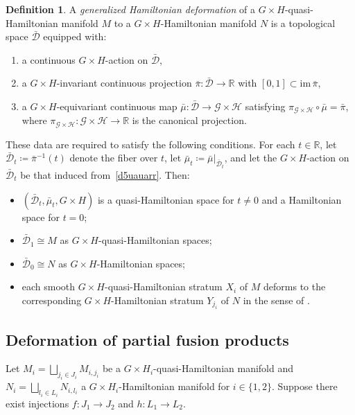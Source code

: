 \documentclass[reqno]{amsart}
\theoremstyle{plain}
\theoremstyle{definition}
\newtheorem{Def}[Thm]{Definition}
\begin{document}
\begin{Def}\label{gen H}
A \emph{generalized Hamiltonian deformation} of a $G\times H$-quasi-Hamiltonian manifold $M$ to a $G\times H$-Hamiltonian manifold $N$ is a topological space $\bar{\mathcal{D}}$ equipped with:
\begin{enumerate}[label={\textup{(\roman*)}}]
\item\label{d5uauarr} a continuous $G\times H$-action on $\bar{\mathcal{D}}$,
\item a $G\times H$-invariant continuous projection $\bar{\pi}: \bar{\mathcal{D}} \to \mathbb{R}$ with $[0,1] \subset \mathrm{im}\,\bar{\pi}$,
\item a $G\times H$-equivariant continuous map $\bar{\mu}: \bar{\mathcal{D}} \to \mathcal{G} \times \mathcal{H}$ satisfying $\pi_{\mathcal{G} \times \mathcal{H}} \circ \bar{\mu} = \bar{\pi}$, where $\pi_{\mathcal{G} \times \mathcal{H}}: \mathcal{G} \times \mathcal{H} \to \mathbb{R}$ is the canonical projection.
\end{enumerate}
These data are required to satisfy the following conditions. For each $t \in \mathbb{R}$, let $\bar{\mathcal{D}}_t \coloneqq \bar{\pi}^{-1}(t)$ denote the fiber over $t$, let $\bar{\mu}_t \coloneqq \bar{\mu}|_{\bar{\mathcal{D}}_t}$, and let the $G\times H$-action on $\bar{\mathcal{D}}_t$ be that induced from~\ref{d5uauarr}. Then:
\begin{itemize}
\item $(\bar{\mathcal{D}}_t, \bar{\mu}_t, G\times H)$ is a quasi-Hamiltonian space for $t \neq 0$ and a Hamiltonian space for $t = 0$;
\item $\bar{\mathcal{D}}_1 \cong M$ as $G\times H$-quasi-Hamiltonian spaces;
\item $\bar{\mathcal{D}}_0 \cong N$ as $G\times H$-Hamiltonian spaces;
\item each smooth $G\times H$-quasi-Hamiltonian stratum $X_i$ of $M$ deforms to the corresponding $G\times H$-Hamiltonian stratum $Y_{j_i}$ of $N$ in the sense of \cite[Definition~2.5]{JMM2025deformations}.
\end{itemize}
\end{Def}


\subsection{Deformation of partial fusion products}

Let $M_{i} = \bigsqcup_{j_{i}\in J_{i}} M_{i,j_{i}}$ be a $G\times H_i$-quasi-Hamiltonian manifold and $N_{i} = \bigsqcup_{l_{i}\in L_{i}} N_{i,l_{i}}$ a $G\times H_i$-Hamiltonian manifold for $i \in \{1,2\}$. Suppose there exist injections $f: J_{1} \to J_{2}$ and $h: L_{1} \to L_{2}$.
\end{document}
